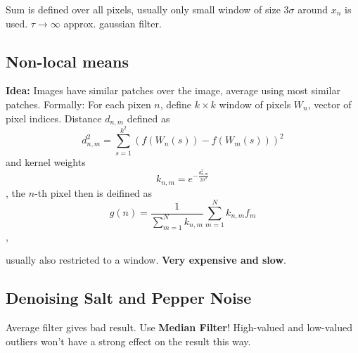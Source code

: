 Sum is defined over all pixels, usually only small window of size $3\sigma$ around $x_n$ is used. $\tau \rightarrow \infty$ approx. gaussian filter.

\subsection{Non-local means}

\textbf{Idea:} Images have similar patches over the image, average using most similar patches. Formally: For each pixen $n$, define $k\times k$ window of pixels $W_n$, vector of pixel indices. Distance $d_{n,m}$ defined as $$d^2_{n,m} = \sum\limits_{s=1}^{k^2} (f(W_n(s)) - f(W_m(s)))^2$$ and kernel weights $$k_{n,m} = e^{-\frac{d_{n,m}^2}{2\sigma^2}}$$, the $n$-th pixel then is deifined as $$g(n) = \dfrac{1}{\sum\limits_{m=1}^{N} k_{n,m}} \sum\limits_{m=1}^N k_{n,m} f_m$$,

usually also restricted to a window. \textbf{Very expensive and slow}.

\subsection{Denoising Salt and Pepper Noise}

Average filter gives bad result. Use \textbf{Median Filter}! High-valued and low-valued outliers won't have a strong effect on the result this way.























